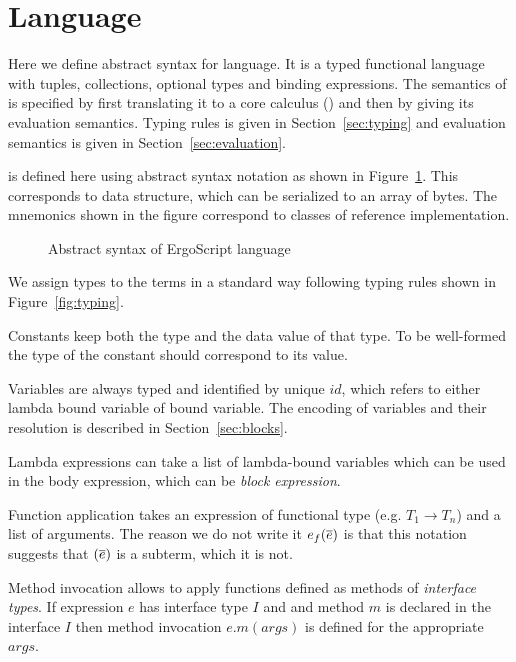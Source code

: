 \section{Language}
\label{sec:language}

Here we define abstract syntax for \langname language. It is a typed
functional language with tuples, collections, optional types and 
binding expressions. The semantics of \langname is specified by first
translating it to a core calculus (\corelang) and then by giving its
evaluation semantics. Typing rules is given in Section~\ref{sec:typing} and
evaluation semantics is given in Section~\ref{sec:evaluation}.

\langname is defined here using abstract syntax notation as shown in
Figure~\ref{fig:language}. This corresponds to  data structure,
which can be serialized to an array of bytes. The mnemonics shown in the
figure correspond to classes of  reference implementation.

\begin{figure}[h]
    \footnotesize
    
    \caption{Abstract syntax of ErgoScript language}
    \label{fig:language}
\end{figure}
    
We assign types to the terms in a standard way following typing rules shown
in Figure~\ref{fig:typing}.

Constants keep both the type and the data value of that type. To be
well-formed the type of the constant should correspond to its value.

Variables are always typed and identified by unique $id$, which refers to
either lambda bound variable of  bound variable. The encoding of
variables and their resolution is described in Section~\ref{sec:blocks}.

Lambda expressions can take a list of lambda-bound variables which can be
used in the body expression, which can be \emph{block expression}. 

Function application takes an expression of functional type (e.g. $T_1 \to
T_n$) and a list of arguments. The reason we do not write it $e_f(\overline{e})$
is that this notation suggests that $(\overline{e})$ is a subterm, which it is not.

Method invocation allows to apply functions defined as methods of
\emph{interface types}. If expression $e$ has interface type $I$ and and
method $m$ is declared in the interface $I$ then method invocation
$e.m(args)$ is defined for the appropriate $args$.

